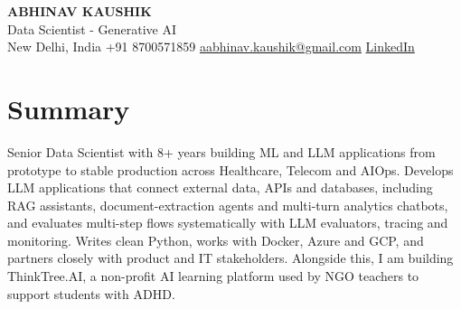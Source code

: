 \documentclass[10pt,a4paper]{article}
\begin{document}
\begin{center}
  {\LARGE\bfseries ABHINAV KAUSHIK}\\[2pt]
  {\large Data Scientist - Generative AI}\\[2pt]
  New Delhi, India \textbar{} +91 8700571859 \textbar{} \href{mailto:aabhinav.kaushik@gmail.com}{aabhinav.kaushik@gmail.com} \textbar{} \href{https://www.linkedin.com/in/abhinav-kaushik10/}{LinkedIn}  
\end{center}

\section{Summary}
Senior Data Scientist with 8+ years building ML and LLM applications from prototype to stable production across Healthcare, Telecom and AIOps. Develops LLM applications that connect external data, APIs and databases, including RAG assistants, document-extraction agents and multi-turn analytics chatbots, and evaluates multi-step flows systematically with LLM evaluators, tracing and monitoring. Writes clean Python, works with Docker, Azure and GCP, and partners closely with product and IT stakeholders. Alongside this, I am building ThinkTree.AI, a non-profit AI learning platform used by NGO teachers to support students with ADHD.
\end{document}
